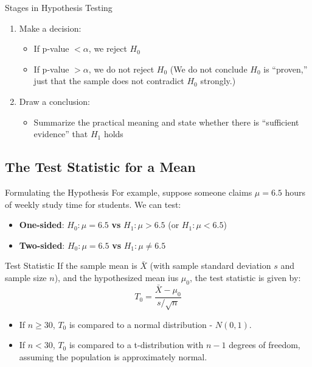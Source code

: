 \documentclass[10pt]{extarticle}
\begin{document}
\begin{conceptbox}{Stages in Hypothesis Testing}{}
\begin{enumerate}
        \item  Make a decision:
              \begin{itemize}
                  \item If p-value $< \alpha$, we reject $H_0$
                  \item If p-value $ > \alpha$, we do not reject $H_0$ (We do not conclude $H_0$ is “proven,” just that the sample does not contradict $H_0$ strongly.)
              \end{itemize}
        \item Draw a conclusion:
              \begin{itemize}
                  \item Summarize the practical meaning and state whether there is “sufficient evidence” that $H_1$ holds
              \end{itemize}
    \end{enumerate}
\end{conceptbox}


\subsection{The Test Statistic for a Mean}
\begin{conceptbox}{Formulating the Hypothesis}{}
    For example, suppose someone claims $\mu = 6.5$ hours of weekly study time for students. We can test:
    \begin{itemize}
        \item \textbf{One-sided}: $H_0: \mu = 6.5$ \textbf{vs} $H_1: \mu > 6.5$ (or $H_1: \mu < 6.5$)
        \item \textbf{Two-sided}: $H_0: \mu = 6.5$ \textbf{vs} $H_1: \mu \neq 6.5$
    \end{itemize}
\end{conceptbox}



\begin{definitionbox}{Test Statistic}{}
    If the sample mean is $\bar{X}$ (with sample standard deviation $s$ and sample size $n$), and the hypothesized mean ius $\mu_0$, the test statistic is given by:
    $$T_0 = \frac{\bar{X} - \mu_0}{s/\sqrt{n}}$$
    \begin{itemize}
        \item If $n \geq 30$,  $T_0$ is compared to a normal distribution - $N(0, 1)$.
        \item If $n < 30$, $T_0$ is compared to a t-distribution with $n-1$ degrees of freedom, assuming the population is approximately normal.
    \end{itemize}
\end{definitionbox}
\end{document}
